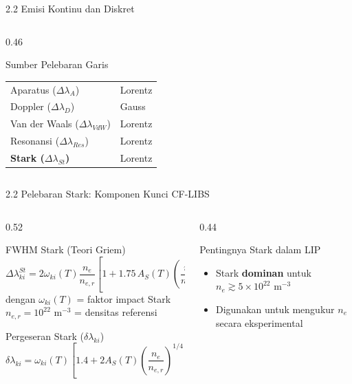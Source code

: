\documentclass[aspectratio=169, 10pt]{beamer}
\newcommand{\redalert}[1]{\textcolor{red!70!black}{\textbf{#1}}}
\begin{document}
\begin{frame}{2.2 Emisi Kontinu dan Diskret}
\begin{columns}[T]
\begin{column}{0.46\textwidth}
\begin{alertblock}{Sumber Pelebaran Garis}
\begin{tabular}{ll}
          \midrule
          Aparatus ($\Delta\lambda_A$) & Lorentz \\
          Doppler ($\Delta\lambda_D$) & Gauss \\
          Van der Waals ($\Delta\lambda_{VdW}$) & Lorentz \\
          Resonansi ($\Delta\lambda_{Res}$) & Lorentz \\
          \redalert{Stark ($\Delta\lambda_{St}$)} & Lorentz \\
          \bottomrule
        \end{tabular}
      \end{alertblock}
    \end{column}
  \end{columns}
\end{frame}

\begin{frame}{2.2 Pelebaran Stark: Komponen Kunci CF-LIBS}
  \begin{columns}[T]
    \begin{column}{0.52\textwidth}
      \begin{block}{FWHM Stark (Teori Griem)}
        \footnotesize
        \begin{equation}
          \Delta\lambda_{ki}^{St} = 2\omega_{ki}(T)\frac{n_e}{n_{e,r}}
          \left[1 + 1.75\,A_S(T)\!\left(\frac{n_e}{n_{e,r}}\right)^{1/4}\!\!\left(1-\frac{3}{4}N_D^{-1/3}\right)\right]
        \end{equation}
        dengan $\omega_{ki}(T)$ = faktor impact Stark\\
        $n_{e,r} = 10^{22}$ m$^{-3}$ = densitas referensi
      \end{block}
      \begin{block}{Pergeseran Stark ($\delta\lambda_{ki}$)}
        \footnotesize
        \begin{equation}
          \delta\lambda_{ki} = \omega_{ki}(T)\left[1.4 + 2A_S(T)\left(\frac{n_e}{n_{e,r}}\right)^{1/4}\!\!\left(1-N_D^{-1/3}\right)\right]
        \end{equation}
      \end{block}
    \end{column}
    \begin{column}{0.44\textwidth}
      \begin{exampleblock}{Pentingnya Stark dalam LIP}
        \begin{itemize}\small
          \item Stark \textbf{dominan} untuk $n_e \gtrsim 5\times10^{22}$ m$^{-3}$
          \item Digunakan untuk mengukur $n_e$ secara eksperimental

\end{itemize}
\end{exampleblock}
\end{column}
\end{columns}
\end{frame}
\end{document}
